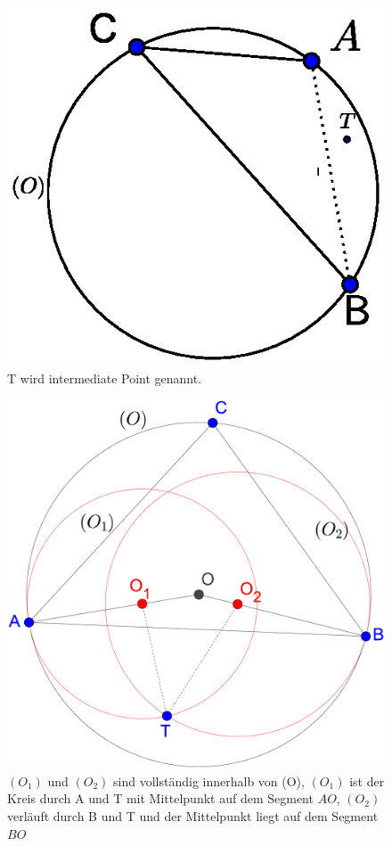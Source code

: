 \documentclass[a4paper,twoside]{IEEEtran}
\begin{document}
\begin{figure}[h!]
\centering
\includegraphics[width=1\linewidth]{outward_path1.eps}
\caption{T wird intermediate Point genannt.}
\label{fig:intermediate}
\end{figure}

\begin{figure}[h!]
\centering
\includegraphics[width=0.8\linewidth]{outward_path_kreise.eps}
\caption{ $(O_1) $ und $(O_2) $ sind vollständig innerhalb von (O), $(O_1) $ ist der Kreis durch A und T mit Mittelpunkt auf dem Segment $AO $, $(O_2) $ verläuft durch B und T und der Mittelpunkt liegt auf dem Segment $BO $} 
\label{fig:outward_path_kreise}
\end{figure}
\end{document}
